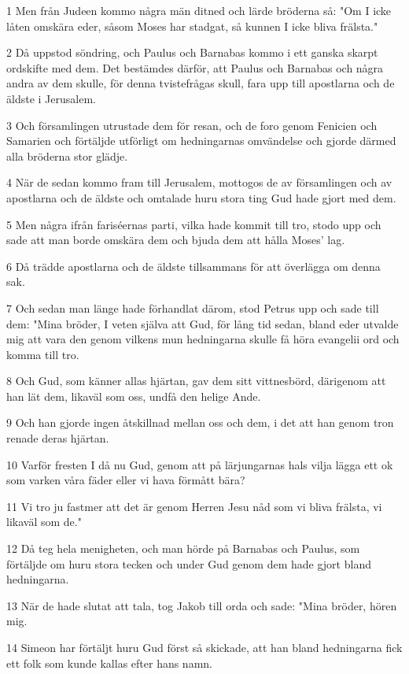 \par 1 Men från Judeen kommo några män ditned och lärde bröderna så: "Om I icke låten omskära eder, såsom Moses har stadgat, så kunnen I icke bliva frälsta."
\par 2 Då uppstod söndring, och Paulus och Barnabas kommo i ett ganska skarpt ordskifte med dem. Det bestämdes därför, att Paulus och Barnabas och några andra av dem skulle, för denna tvistefrågas skull, fara upp till apostlarna och de äldste i Jerusalem.
\par 3 Och församlingen utrustade dem för resan, och de foro genom Fenicien och Samarien och förtäljde utförligt om hedningarnas omvändelse och gjorde därmed alla bröderna stor glädje.
\par 4 När de sedan kommo fram till Jerusalem, mottogos de av församlingen och av apostlarna och de äldste och omtalade huru stora ting Gud hade gjort med dem.
\par 5 Men några ifrån fariséernas parti, vilka hade kommit till tro, stodo upp och sade att man borde omskära dem och bjuda dem att hålla Moses' lag.
\par 6 Då trädde apostlarna och de äldste tillsammans för att överlägga om denna sak.
\par 7 Och sedan man länge hade förhandlat därom, stod Petrus upp och sade till dem: "Mina bröder, I veten själva att Gud, för lång tid sedan, bland eder utvalde mig att vara den genom vilkens mun hedningarna skulle få höra evangelii ord och komma till tro.
\par 8 Och Gud, som känner allas hjärtan, gav dem sitt vittnesbörd, därigenom att han lät dem, likaväl som oss, undfå den helige Ande.
\par 9 Och han gjorde ingen åtskillnad mellan oss och dem, i det att han genom tron renade deras hjärtan.
\par 10 Varför fresten I då nu Gud, genom att på lärjungarnas hals vilja lägga ett ok som varken våra fäder eller vi hava förmått bära?
\par 11 Vi tro ju fastmer att det är genom Herren Jesu nåd som vi bliva frälsta, vi likaväl som de."
\par 12 Då teg hela menigheten, och man hörde på Barnabas och Paulus, som förtäljde om huru stora tecken och under Gud genom dem hade gjort bland hedningarna.
\par 13 När de hade slutat att tala, tog Jakob till orda och sade: "Mina bröder, hören mig.
\par 14 Simeon har förtäljt huru Gud först så skickade, att han bland hedningarna fick ett folk som kunde kallas efter hans namn.
